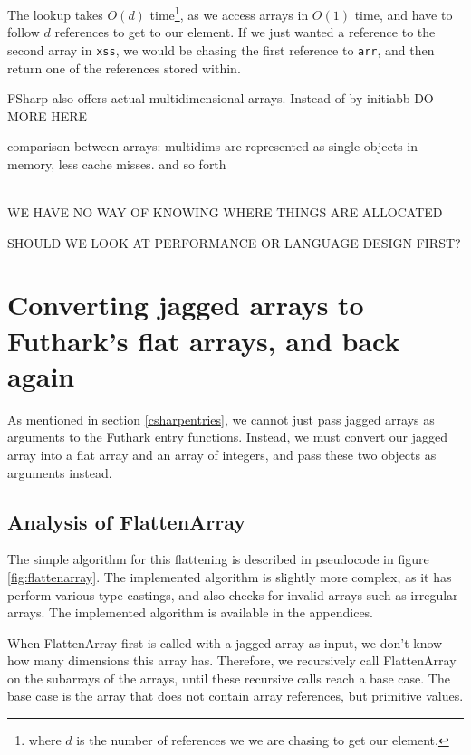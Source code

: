 The lookup takes $O(d)$ time\footnote{where $d$ is the number of references we
  we are chasing to get our element.}, as we access arrays in $O(1)$ time, and have to follow $d$
references to get to our element. If we just wanted a reference to the second
array in \texttt{xss}, we would be chasing the first reference to \texttt{arr},
and then return one of the references stored within.

FSharp also offers actual multidimensional arrays.
Instead of  by initiabb DO MORE HERE


comparison between arrays: multidims are represented as single objects in
memory, less cache misses. 
and so forth

\\

WE HAVE NO WAY OF KNOWING WHERE THINGS ARE ALLOCATED

SHOULD WE LOOK AT PERFORMANCE OR LANGUAGE DESIGN FIRST?


\section{Converting jagged arrays to Futhark's flat arrays,  and back again}
As mentioned in section \ref{csharpentries}, we cannot just pass jagged arrays
as arguments to the Futhark \csharp{} entry functions.
Instead, we must convert our jagged array into a flat array and an array of
integers, and pass these two objects as arguments instead.

\subsection{Analysis of FlattenArray}
The simple algorithm for this flattening is described in pseudocode in figure
\ref{fig:flattenarray}. The implemented algorithm is slightly more complex, as
it has perform various type castings, and also checks for invalid arrays such as
irregular arrays.
The implemented algorithm is available in the appendices.

When FlattenArray first is called with a jagged array as input, we don't know
how many dimensions this array has. Therefore, we recursively call FlattenArray
on the subarrays of the arrays, until these recursive calls reach a base case.
The base case is the array that does not contain array references, but primitive
values.


